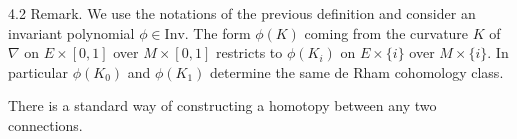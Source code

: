 4.2 Remark. We use the notations of the previous definition and consider an invariant polynomial $\phi \in \text{Inv}$. The form $\phi(K)$ coming from the curvature $K$ of $\nabla$ on $E \times [0,1]$ over $M \times [0,1]$ restricts to $\phi(K_i)$ on $E \times \{i\}$ over $M \times \{i\}$. In particular $\phi(K_0)$ and $\phi(K_1)$ determine the same de Rham cohomology class.

There is a standard way of constructing a homotopy between any two connections.
